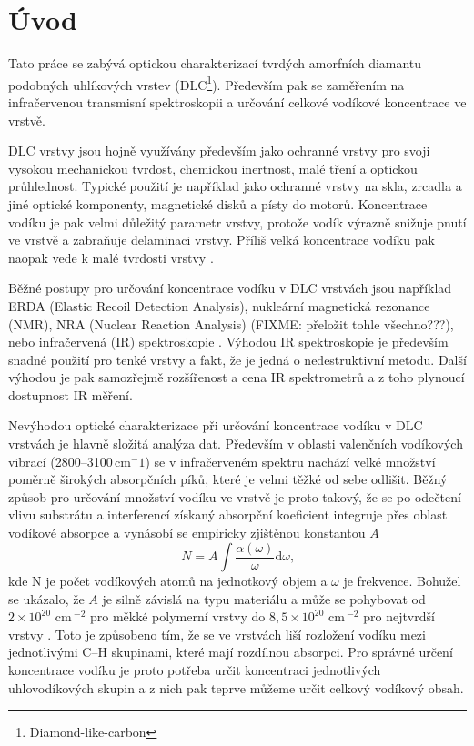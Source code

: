 \chapter*{Úvod}
\setcounter{page}{1}

Tato práce se zabývá optickou charakterizací tvrdých amorfních diamantu podobných uhlíkových vrstev (DLC\footnote{Diamond-like-carbon}). Především pak se zaměřením na infračervenou transmisní spektroskopii a určování celkové vodíkové koncentrace ve vrstvě.

DLC vrstvy jsou hojně využívány především jako ochranné vrstvy pro svoji vysokou mechanickou tvrdost, chemickou inertnost, malé tření a optickou průhlednost. Typické použití je například jako ochranné vrstvy na skla, zrcadla a jiné optické komponenty, magnetické disků a písty do motorů. Koncentrace vodíku je pak velmi důležitý parametr vrstvy, protože vodík výrazně snižuje pnutí ve vrstvě a zabraňuje delaminaci vrstvy. Příliš velká koncentrace vodíku pak naopak vede k malé tvrdosti vrstvy \cite{Robertson2002}. 

Běžné postupy pro určování koncentrace vodíku v DLC vrstvách jsou například ERDA (Elastic Recoil Detection Analysis), nukleární magnetická rezonance (NMR), NRA (Nuclear Reaction Analysis) (FIXME: přeložit tohle všechno???), nebo infračervená (IR) spektroskopie \cite{Robertson2002}. Výhodou IR spektroskopie je především snadné použití pro tenké vrstvy a fakt, že je jedná o nedestruktivní metodu. Další výhodou je pak samozřejmě rozšířenost a cena IR spektrometrů a z toho plynoucí dostupnost IR měření.

Nevýhodou optické charakterizace při určování koncentrace vodíku v DLC vrstvách je hlavně složitá analýza dat. Především v oblasti valenčních vodíkových vibrací (2800--3100\,cm$^-1$) se v infračerveném spektru nachází velké množství poměrně širokých absorpčních píků, které je velmi těžké od sebe odlišit. Běžný způsob pro určování množství vodíku ve vrstvě je proto takový, že se po odečtení vlivu substrátu a interferencí získaný absorpční koeficient integruje přes oblast vodíkové absorpce a vynásobí se empiricky zjištěnou konstantou $A$
\begin{equation}
N = A \int \frac{\alpha(\omega)}{\omega} \mathrm{d}\omega \text{,}
\end{equation}
kde N je počet vodíkových atomů na jednotkový objem a $\omega$ je frekvence. Bohužel se ukázalo, že $A$ je silně závislá na typu materiálu a může se pohybovat od $2 \times 10^{20}$ cm\,$^{-2}$ pro měkké polymerní vrstvy do $8,5 \times 10^{20}$ cm\,$^{-2}$ pro nejtvrdší vrstvy \cite{jacob1996}. Toto je způsobeno tím, že se ve vrstvách liší rozložení vodíku mezi jednotlivými C--H skupinami, které mají rozdílnou absorpci. Pro správné určení koncentrace vodíku je proto potřeba určit koncentraci jednotlivých uhlovodíkových skupin a z nich pak teprve můžeme určit celkový vodíkový obsah. 

